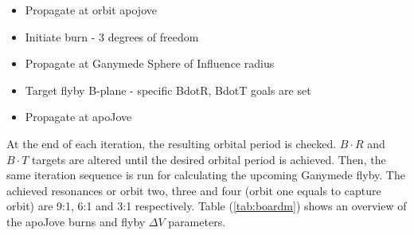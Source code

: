 \begin{itemize}
  \item Propagate at orbit apojove
  \item Initiate burn - 3 degrees of freedom
  \item Propagate at Ganymede Sphere of Influence radius
  \item Target flyby B-plane - specific BdotR, BdotT goals are set
  \item Propagate at apoJove
\end{itemize}

At the end of each iteration, the resulting orbital period is checked. $B\cdot R$ and $B\cdot T$ targets are altered until the desired orbital period is achieved. Then, the same iteration sequence is run for calculating the upcoming Ganymede flyby. The achieved resonances or orbit two, three and four (orbit one equals to capture orbit) are 9:1, 6:1 and 3:1 respectively. 
Table (\ref{tab:boardm}) shows an overview of the apoJove burns and flyby $\Delta V$ parameters.

